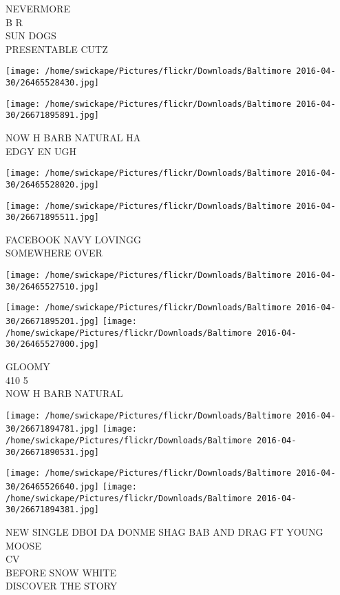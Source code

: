 \documentclass[10pt,letterpaper]{article}
\begin{document}
NEVERMORE\\
B R\\
SUN DOGS\\
PRESENTABLE CUTZ
\pagebreak

\texttt{[image: /home/swickape/Pictures/flickr/Downloads/Baltimore 2016-04-30/26465528430.jpg]}

\vspace{0.25in}
\texttt{[image: /home/swickape/Pictures/flickr/Downloads/Baltimore 2016-04-30/26671895891.jpg]}

NOW H BARB NATURAL HA\\
EDGY EN UGH
\pagebreak

\texttt{[image: /home/swickape/Pictures/flickr/Downloads/Baltimore 2016-04-30/26465528020.jpg]}

\vspace{0.25in}
\texttt{[image: /home/swickape/Pictures/flickr/Downloads/Baltimore 2016-04-30/26671895511.jpg]}

FACEBOOK NAVY LOVINGG\\
SOMEWHERE OVER
\pagebreak

\texttt{[image: /home/swickape/Pictures/flickr/Downloads/Baltimore 2016-04-30/26465527510.jpg]}

\vspace{0.25in}
\texttt{[image: /home/swickape/Pictures/flickr/Downloads/Baltimore 2016-04-30/26671895201.jpg]}
\texttt{[image: /home/swickape/Pictures/flickr/Downloads/Baltimore 2016-04-30/26465527000.jpg]}

GLOOMY\\
410 5\\
NOW H BARB NATURAL
\pagebreak

\texttt{[image: /home/swickape/Pictures/flickr/Downloads/Baltimore 2016-04-30/26671894781.jpg]}
\texttt{[image: /home/swickape/Pictures/flickr/Downloads/Baltimore 2016-04-30/26671890531.jpg]}

\texttt{[image: /home/swickape/Pictures/flickr/Downloads/Baltimore 2016-04-30/26465526640.jpg]}
\texttt{[image: /home/swickape/Pictures/flickr/Downloads/Baltimore 2016-04-30/26671894381.jpg]}

NEW SINGLE DBOI DA DONME SHAG BAB AND DRAG FT YOUNG MOOSE\\
CV\\
BEFORE SNOW WHITE\\
DISCOVER THE STORY
\pagebreak
\end{document}
